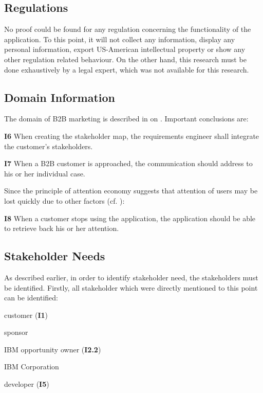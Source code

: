 \subsection{Regulations}
No proof could be found for any regulation concerning the functionality of the application. To this point, it will not collect any information, display any personal information, export US-American intellectual property or show any other regulation related behaviour. On the other hand, this research must be done exhaustively by a legal expert, which was not available for this research.

\subsection{Domain Information}
The domain of B2B marketing is described in \Cref{} on \cpagerefrange{}{}. Important conclusions are: 

\begin{closeItem}
    \item [\textbf{I6}] When creating the stakeholder map, the requirements engineer shall integrate the customer's stakeholders.
    \item [\textbf{I7}] When a B2B customer is approached, the communication should address to his or her individual case.
\end{closeItem}

Since the principle of attention economy suggests that attention of users may be lost quickly due to other factors (cf. \Cref{}):

\begin{closeItem}
    \item [\textbf{I8}] When a customer stops using the application, the application should be able to retrieve back his or her attention.
\end{closeItem}

\paragraph{}

\subsection{Stakeholder Needs}
As described earlier, in order to identify stakeholder need, the stakeholders must be identified. Firstly, all stakeholder which were directly mentioned to this point can be identified:

\begin{closeItemCol}
    \item customer (\textbf{I1})
    \item sponsor
    \item IBM opportunity owner (\textbf{I2.2})
    \item IBM Corporation
    \item developer (\textbf{I5})
\end{closeItemCol}

